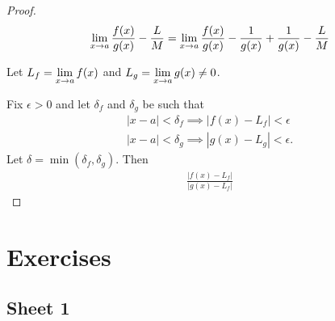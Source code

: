 \begin{proof}
  \begin{align*}
    \lim\limits_{x \to a} \frac{f(x)}{g(x)} - \frac{L}{M}
    = \lim\limits_{x \to a} \frac{f(x)}{g(x)} - \frac{1}{g(x)} + \frac{1}{g(x)} - \frac{L}{M}
  \end{align*}

  Let $L_f = \lim\limits_{x \to a} f(x)$ and $L_g = \lim\limits_{x \to a} g(x) \neq 0$.

  Fix $\epsilon > 0$ and let $\delta_f$ and $\delta_g$ be such that
  \begin{align*}
    |x - a| < \delta_f \implies |f(x) - L_f| < \epsilon\\
    |x - a| < \delta_g \implies |g(x) - L_g| < \epsilon.
  \end{align*}
  Let $\delta = \min(\delta_f, \delta_g)$. Then
  \begin{align*}
    \frac{|f(x) - L_f|}{|g(x) - L_f|}
  \end{align*}
\end{proof}



\section{Exercises}

\subsection{Sheet 1}

